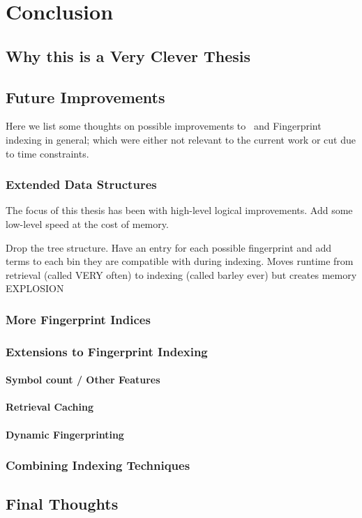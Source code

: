 
\chapter{Conclusion}
\label{cha:conclusion}

\section{Why this is a Very Clever Thesis}
\label{sec:why}

\section{Future Improvements}
\label{sec:future}

Here we list some thoughts on possible improvements to \beagle\ and Fingerprint
indexing in general; which were either not relevant to the current work or
cut due to time constraints.

\subsection{Extended Data Structures}
The focus of this thesis has been with high-level logical improvements.
Add some low-level speed at the cost of memory.

Drop the tree structure. Have an entry for each possible fingerprint and add terms
to each bin they are compatible with during indexing. Moves runtime from
retrieval (called VERY often) to indexing (called barley ever) but creates memory
EXPLOSION

\subsection{More Fingerprint Indices}

\subsection{Extensions to Fingerprint Indexing}

\subsubsection{Symbol count / Other Features}
\subsubsection{Retrieval Caching}
\subsubsection{Dynamic Fingerprinting}

\subsection{Combining Indexing Techniques}

\section{Final Thoughts}

